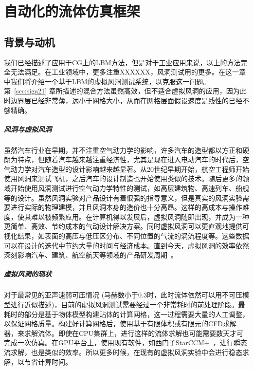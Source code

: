 \chapter{自动化的流体仿真框架}
\label{sec:sig23}

\section{背景与动机}
我们已经描述了应用于CG上的LBM方法，但是对于工业应用来说，以上的方法完全无法满足。在工业领域中，更多注重XXXXXX，风洞测试用的更多。在这一章中我们将介绍一个基于LBM的虚拟风洞测试系统，以克服这一问题。第~\ref{sec:siga21} 章所描述的混合方法虽然高效，但不适合虚拟风洞的应用，因为此时边界层已经非常薄，远小于网格大小，从而在网格层面假设速度是线性的已经不够精确。

\paragraph{风洞与虚拟风洞}
虽然汽车行业在早期，并不注重空气动力学的影响，许多汽车的造型都以方正和硬朗为特点，但随着汽车越来越注重经济性，尤其是现在进入电动汽车的时代后，空气动力学对汽车造型的设计影响越来越显著。从20世纪早期开始，航空工程师开始使用风洞来测试飞机，之后汽车的设计制造也开始使用类似的技术。随后更多的领域开始使用风洞测试进行空气动力学特性的测试，如高层建筑物、高速列车、船舰等的设计。虽然风洞实验对产品设计有着很强的指导意义，但是真实的风洞实验需要进行实际的物理建模，并且风洞本身的造价也十分高昂。这样的高成本与操作难度，使其难以被频繁应用。在计算机得以发展后，虚拟风洞随即出现，并成为一种更简单、高效、节约成本的气动设计解决方案。同时虚拟风洞可以更直观地提供可视化结果，如表面的高压与低压区分布、不同位置的气流的涡流程度等。这些数据可以在设计的迭代中节约大量的时间与经济成本。直到今天，虚拟风洞的效率依然深刻影响汽车、建筑、航空航天等领域的产品研发周期~\cite{HighriseBuildings,windScience}。

\paragraph{虚拟风洞的现状}
对于最常见的亚声速弱可压情况 (马赫数小于0.3时，此时流体依然可以用不可压模型进行近似描述)，目前的虚拟风洞测试需要经过一个非常耗时的前处理阶段。最耗时的部分是基于物体模型构建贴体的计算网格，这一过程需要大量的人工调整，以保证网格质量。构建好计算网格后，使用基于有限体积或有限元的CFD求解器，来求解流体。即使在CPU集群上，进行这样的流体求解也可能需要数天才可完成一次仿真。在GPU平台上，使用现有软件，如西门子StarCCM+~\cite{Siemens}，进行瞬态流求解，也是类似的效率。所以更多时候，在现有的虚拟风洞实验中会进行稳态求解，以节省计算时间。

